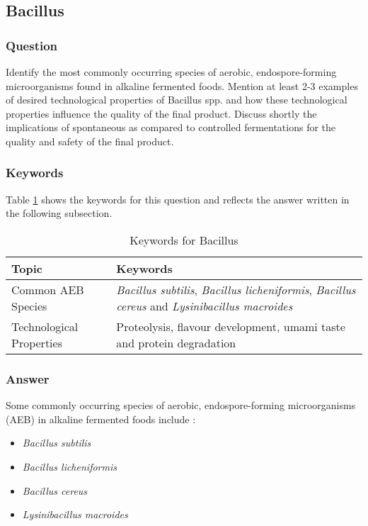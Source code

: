 \subsection{Bacillus}
\subsubsection*{Question}
Identify the most commonly occurring species of aerobic, endospore-forming microorganisms found in alkaline fermented foods. Mention at least 2-3 examples of desired technological properties of Bacillus spp. and how these technological properties influence the quality of the final product. Discuss shortly the implications of spontaneous as compared to controlled fermentations for the quality and safety of the final product.  

\subsubsection*{Keywords}
Table \ref{tab:KW-Bacillus} shows the keywords for this question and reflects the answer written in the following subsection.
\begin{table}[h]
    \centering
    \caption{Keywords for Bacillus}
    \label{tab:KW-Bacillus}
    \begin{tabular}{l|l}
        \textbf{Topic} & \textbf{Keywords} \\
        \hline
        Common AEB Species & \textit{Bacillus subtilis}, \textit{Bacillus licheniformis}, \textit{Bacillus cereus} and \textit{Lysinibacillus macroides}\\
        Technological Properties & Proteolysis, flavour development, umami taste and protein degradation\\
    \end{tabular}
\end{table}

\subsubsection*{Answer}
Some commonly occurring species of aerobic, endospore-forming microorganisms (AEB) in alkaline fermented foods include \cite*{L8-ImpQuorum}:
\begin{itemize}
    \item \textit{Bacillus subtilis}
    \item \textit{Bacillus licheniformis}
    \item \textit{Bacillus cereus}
    \item \textit{Lysinibacillus macroides}
\end{itemize}

